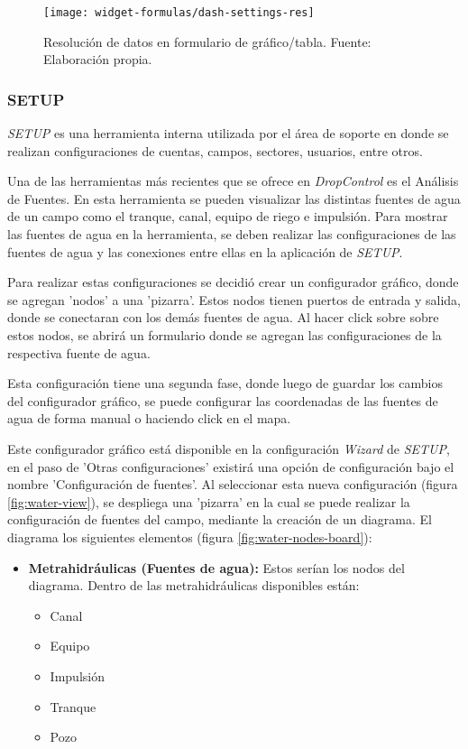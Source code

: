 \begin{figure}[H]
	\centering
	\texttt{[image: widget-formulas/dash-settings-res]}
	\caption{\label{fig:dash-settings-res} Resolución de datos en formulario de gráfico/tabla. Fuente: Elaboración propia.}
\end{figure}

\iffalse
\subsubsection{SETUP}

\textit{SETUP} es una herramienta interna utilizada por el área de soporte en donde se realizan configuraciones de cuentas, campos, sectores, usuarios, entre otros.


Una de las herramientas más recientes que se ofrece en \textit{DropControl} es el Análisis de Fuentes. En esta herramienta se pueden visualizar las distintas fuentes de agua de un campo como el tranque, canal, equipo de riego e impulsión.
Para mostrar las fuentes de agua en la herramienta, se deben realizar las configuraciones de las fuentes de agua y las conexiones entre ellas en la aplicación de \textit{SETUP}.

Para realizar estas configuraciones se decidió crear un configurador gráfico, donde se agregan 'nodos' a una 'pizarra'. Estos nodos tienen puertos de entrada y salida, donde se conectaran con los demás fuentes de agua. Al hacer click sobre sobre estos nodos, se abrirá un formulario donde se agregan las configuraciones de la respectiva fuente de agua.

Esta configuración tiene una segunda fase, donde luego de guardar los cambios del configurador gráfico, se puede configurar las coordenadas de las fuentes de agua de forma manual o haciendo click en el mapa.

Este configurador gráfico está disponible en la configuración \textit{Wizard} de \textit{SETUP}, en el paso de 'Otras configuraciones' existirá una opción de configuración bajo el nombre 'Configuración de fuentes'.
Al seleccionar esta nueva configuración (figura \ref{fig:water-view}), se despliega una 'pizarra' en la cual se puede realizar la configuración de fuentes del campo, mediante la creación de un diagrama. El diagrama los siguientes elementos (figura \ref{fig:water-nodes-board}):
\begin{itemize}
    \item \textbf{Metrahidráulicas (Fuentes de agua):} Estos serían los nodos del diagrama. Dentro de las metrahidráulicas disponibles están:
          \begin{itemize}
              \item Canal
              \item Equipo
              \item Impulsión
              \item Tranque
              \item Pozo
          \end{itemize}   
\end{itemize}

